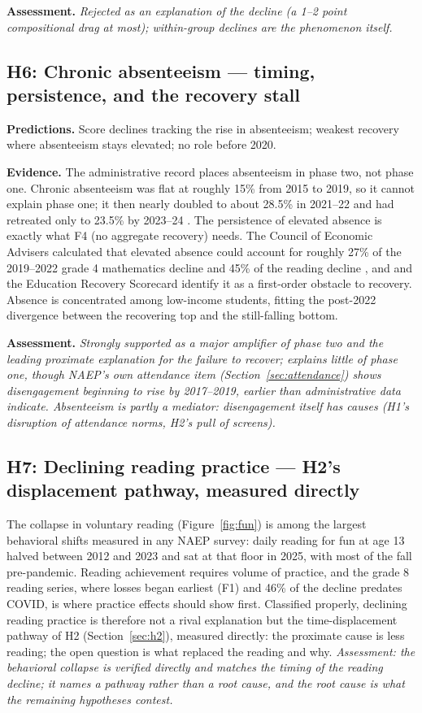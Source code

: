 \documentclass[11pt]{article}
\begin{document}
\textbf{Assessment.} \emph{Rejected as an explanation of the decline (a 1--2 point compositional drag at most); within-group declines are the phenomenon itself.}

\subsection{H6: Chronic absenteeism --- timing, persistence, and the recovery stall}

\textbf{Predictions.} Score declines tracking the rise in absenteeism; weakest recovery where absenteeism stays elevated; no role before 2020.

\textbf{Evidence.} The administrative record places absenteeism in phase two, not phase one. Chronic absenteeism was flat at roughly 15\% from 2015 to 2019, so it cannot explain phase one; it then nearly doubled to about 28.5\% in 2021--22 and had retreated only to 23.5\% by 2023--24 \citep{malkus2025}. The persistence of elevated absence is exactly what F4 (no aggregate recovery) needs. The Council of Economic Advisers calculated that elevated absence could account for roughly 27\% of the 2019--2022 grade 4 mathematics decline and 45\% of the reading decline \citep{cea2023}, and \citet{dee2024} and the Education Recovery Scorecard identify it as a first-order obstacle to recovery. Absence is concentrated among low-income students, fitting the post-2022 divergence between the recovering top and the still-falling bottom.

\textbf{Assessment.} \emph{Strongly supported as a major amplifier of phase two and the leading proximate explanation for the failure to recover; explains little of phase one, though NAEP's own attendance item (Section~\ref{sec:attendance}) shows disengagement beginning to rise by 2017--2019, earlier than administrative data indicate. Absenteeism is partly a mediator: disengagement itself has causes (H1's disruption of attendance norms, H2's pull of screens).}

\subsection{H7: Declining reading practice --- H2's displacement pathway, measured directly}

The collapse in voluntary reading (Figure~\ref{fig:fun}) is among the largest behavioral shifts measured in any NAEP survey: daily reading for fun at age 13 halved between 2012 and 2023 and sat at that floor in 2025, with most of the fall pre-pandemic. Reading achievement requires volume of practice, and the grade 8 reading series, where losses began earliest (F1) and 46\% of the decline predates COVID, is where practice effects should show first. Classified properly, declining reading practice is therefore not a rival explanation but the time-displacement pathway of H2 (Section~\ref{sec:h2}), measured directly: the proximate cause is less reading; the open question is what replaced the reading and why. \emph{Assessment: the behavioral collapse is verified directly and matches the timing of the reading decline; it names a pathway rather than a root cause, and the root cause is what the remaining hypotheses contest.}
\end{document}
